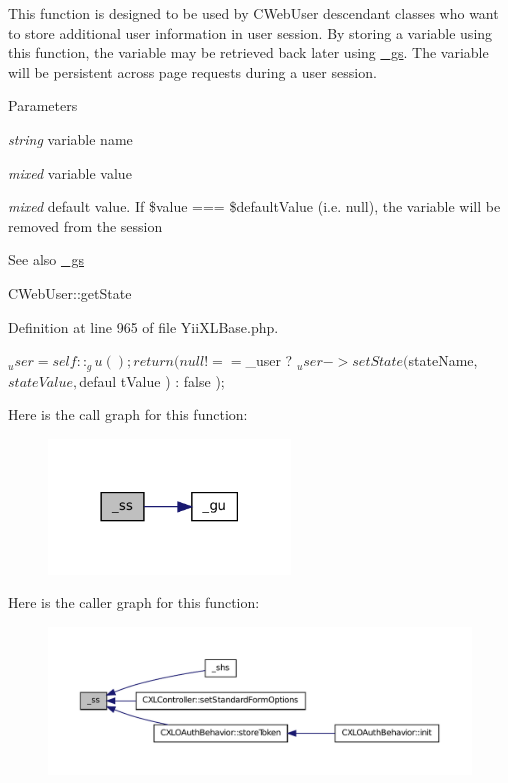 This function is designed to be used by CWebUser descendant classes who want to store additional user information in user session. By storing a variable using this function, the variable may be retrieved back later using \hyperlink{}{\_\-gs}. The variable will be persistent across page requests during a user session.


\begin{DoxyParams}{Parameters}
\item[{\em string}]variable name \item[{\em mixed}]variable value \item[{\em mixed}]default value. If \$value === \$defaultValue (i.e. null), the variable will be removed from the session \end{DoxyParams}
\begin{DoxySeeAlso}{See also}
\hyperlink{classYiiXLBase_adeaa7024db6a25cc45abc37c388661d3}{\_\-gs} 

CWebUser::getState 
\end{DoxySeeAlso}


Definition at line 965 of file YiiXLBase.php.




\begin{DoxyCode}
  {
    $_user = self::_gu();
    return ( null !== $_user ? $_user->setState( $stateName, $stateValue, $defaul
      tValue ) : false );
  }
\end{DoxyCode}




Here is the call graph for this function:\nopagebreak
\begin{figure}[H]
\begin{center}
\leavevmode
\includegraphics[width=182pt]{classYiiXLBase_aa5c4459afda5a8a58c46a26aecafaf37_cgraph}
\end{center}
\end{figure}




Here is the caller graph for this function:\nopagebreak
\begin{figure}[H]
\begin{center}
\leavevmode
\includegraphics[width=400pt]{classYiiXLBase_aa5c4459afda5a8a58c46a26aecafaf37_icgraph}
\end{center}
\end{figure}


